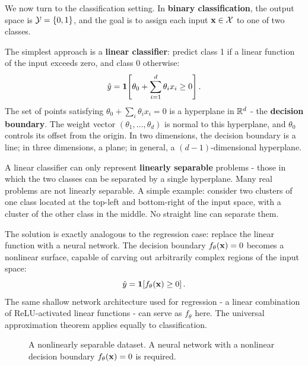 We now turn to the classification setting. In \textbf{binary classification}, the output space is $\mathcal{Y} = \{0, 1\}$, and the goal is to assign each input $\mathbf{x} \in \mathcal{X}$ to one of two classes.

The simplest approach is a \textbf{linear classifier}: predict class 1 if a linear function of the input exceeds zero, and class 0 otherwise:
\begin{equation}
\hat{y} = \mathbf{1}\!\left[\theta_0 + \sum_{i=1}^{d} \theta_i x_i \geq 0\right].
\end{equation}
The set of points satisfying $\theta_0 + \sum_i \theta_i x_i = 0$ is a hyperplane in $\mathbb{R}^d$ - the \textbf{decision boundary}. The weight vector $(\theta_1, \ldots, \theta_d)$ is normal to this hyperplane, and $\theta_0$ controls its offset from the origin. In two dimensions, the decision boundary is a line; in three dimensions, a plane; in general, a $(d-1)$-dimensional hyperplane.

A linear classifier can only represent \textbf{linearly separable} problems - those in which the two classes can be separated by a single hyperplane. Many real problems are not linearly separable. A simple example: consider two clusters of one class located at the top-left and bottom-right of the input space, with a cluster of the other class in the middle. No straight line can separate them.

The solution is exactly analogous to the regression case: replace the linear function with a neural network. The decision boundary $f_\theta(\mathbf{x}) = 0$ becomes a nonlinear surface, capable of carving out arbitrarily complex regions of the input space:
\begin{equation}
\hat{y} = \mathbf{1}\!\left[f_\theta(\mathbf{x}) \geq 0\right].
\end{equation}
The same shallow network architecture used for regression - a linear combination of ReLU-activated linear functions - can serve as $f_\theta$ here. The universal approximation theorem applies equally to classification.

\begin{figure}[h]
    \centering
    \begin{minipage}{0.48\textwidth}
        \centering
        \resizebox{0.9\textwidth}{!}{}
        \caption{A linear classifier separates two classes with a hyperplane. The weight vector $\pvec$ is normal to the decision boundary.}
        \label{fig:classification_linear}
    \end{minipage}
    \hfill
    \begin{minipage}{0.48\textwidth}
        \centering
        \resizebox{\textwidth}{!}{}
        \caption{A nonlinearly separable dataset. A neural network with a nonlinear decision boundary $f_\theta(\mathbf{x}) = 0$ is required.}
        \label{fig:classification_nonlinear}
    \end{minipage}
\end{figure}

